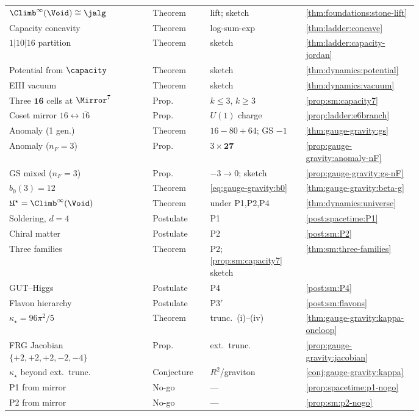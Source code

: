 \begin{table}[ht]
\begin{tabular}{@{}p{0.30\linewidth}p{0.12\linewidth}p{0.20\linewidth}p{0.16\linewidth}@{}}
$\Climb^\infty(\Void)\cong\jalg$ & Theorem & lift; sketch & \ref{thm:foundations:stone-lift} \\
Capacity concavity & Theorem & log-sum-exp & \ref{thm:ladder:concave} \\
$1|10|16$ partition & Theorem & sketch & \ref{thm:ladder:capacity-jordan} \\
Potential from $\capacity$ & Theorem & sketch & \ref{thm:dynamics:potential} \\
EIII vacuum & Theorem & sketch & \ref{thm:dynamics:vacuum} \\
Three $\mathbf{16}$ cells at $\Mirror^7$ & Prop. & $k\leq3$, $k\geq3$ & \ref{prop:sm:capacity7} \\
Coset mirror $16\leftrightarrow\overline{16}$ & Prop. & $U(1)$ charge & \ref{prop:ladder:e6branch} \\
Anomaly (1 gen.) & Theorem & $16-80+64$; GS $-1$ & \ref{thm:gauge-gravity:gs} \\
Anomaly ($n_F=3$) & Prop. & $3\times\mathbf{27}$ & \ref{prop:gauge-gravity:anomaly-nF} \\
GS mixed ($n_F=3$) & Prop. & $-3\to0$; sketch & \ref{prop:gauge-gravity:gs-nF} \\
$b_0(3)=12$ & Theorem & \eqref{eq:gauge-gravity:b0} & \ref{thm:gauge-gravity:beta-g} \\
$\mathfrak{U}^\star=\Climb^\infty(\Void)$ & Theorem & under P1,P2,P4 & \ref{thm:dynamics:universe} \\
\midrule
Soldering, $d=4$ & Postulate & P1 & \ref{post:spacetime:P1} \\
Chiral matter & Postulate & P2 & \ref{post:sm:P2} \\
Three families & Theorem & P2; \ref{prop:sm:capacity7} sketch & \ref{thm:sm:three-families} \\
GUT--Higgs & Postulate & P4 & \ref{post:sm:P4} \\
Flavon hierarchy & Postulate & P3$'$ & \ref{post:sm:flavons} \\
\midrule
$\kappa_\star=96\pi^2/5$ & Theorem & trunc.\ (i)--(iv) & \ref{thm:gauge-gravity:kappa-oneloop} \\
FRG Jacobian $\{+2,+2,+2,-2,-4\}$ & Prop. & ext.\ trunc. & \ref{prop:gauge-gravity:jacobian} \\
$\kappa_\star$ beyond ext.\ trunc. & Conjecture & $R^2$/graviton & \ref{conj:gauge-gravity:kappa} \\
P1 from mirror & No-go & --- & \ref{prop:spacetime:p1-nogo} \\
P2 from mirror & No-go & --- & \ref{prop:sm:p2-nogo} \\

\end{tabular}
\end{table}
